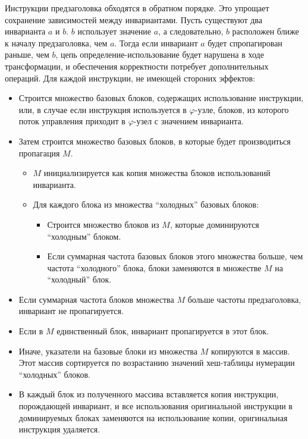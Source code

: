 Инструкции предзаголовка обходятся в обратном порядке.
Это упрощает сохранение зависимостей между инвариантами.
Пусть существуют два инварианта $a$ и $b$.
$b$ использует значение $a$, а следовательно, $b$ расположен ближе к началу предзаголовка, чем $a$.
Тогда если инвариант $a$ будет спропагирован раньше, чем $b$, цепь определение-использование будет нарушена в ходе трансформации, и обеспечения корректности потребует дополнительных операций.
Для каждой инструкции, не имеющей стороних эффектов:
\begin{itemize}
    \item Строится множество базовых блоков, содержащих использование инструкции, или, в случае если инструкция используется в $\varphi$-узле, блоков, из которого поток управления приходит в $\varphi$-узел с значением инварианта.
    \item Затем строится множество базовых блоков, в которые будет производиться пропагация $M$.
        \begin{itemize}
            \item $M$ инициализируется как копия множества блоков использований инварианта.
            \item Для каждого блока из множества \enquote{холодных} базовых блоков:
                \begin{itemize}
                    \item Строится множество блоков из $M$, которые доминируются \enquote{холодным} блоком.
                    \item Если суммарная частота базовых блоков этого множества больше, чем частота \enquote{холодного} блока, блоки заменяются в множестве $M$ на \enquote{холодный} блок.
                \end{itemize}
        \end{itemize}
    \item Если суммарная частота блоков множества $M$ больше частоты предзаголовка, инвариант не пропагируется.
    \item Если в $M$ единственный блок, инвариант пропагируется в этот блок.
    \item Иначе, указатели на базовые блоки из множества $M$ копируются в массив.
        Этот массив сортируется по возрастанию значений хеш-таблицы нумерации \enquote{холодных} блоков.
    \item В каждый блок из полученного массива вставляется копия инструкции, порождающей инвариант, и все использования оригинальной инструкции в доминируемых блоках заменяются на использование копии, оригинальная инструкция удаляется.
\end{itemize}

